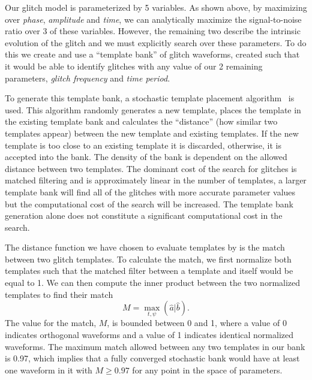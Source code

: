 Our \scl{} glitch model is parameterized by 5 variables. As shown above, by maximizing over \emph{phase}, \emph{amplitude} and \emph{time}, we can analytically maximize the signal-to-noise ratio over 3 of these variables. However, the remaining two describe the intrinsic evolution of the glitch and we must explicitly search over these parameters. To do this we create and use a ``template bank'' of \scl{} glitch waveforms, created such that it would be able to identify glitches with any value of our 2 remaining parameters, \emph{glitch frequency} and \emph{time period}.

To generate this template bank, a stochastic template placement algorithm~\cite{template_bank_placement} is used. This algorithm randomly generates a new template, places the template in the existing template bank and calculates the ``distance'' (how similar two templates appear) between the new template and existing templates. If the new template is too close to an existing template it is discarded, otherwise, it is accepted into the bank. The density of the bank is dependent on the allowed distance between two templates. The dominant cost of the search for \scl{} glitches is matched filtering and is approximately linear in the number of templates, a larger template bank will find all of the glitches with more accurate parameter values but the computational cost of the search will be increased. The template bank generation alone does not constitute a significant computational cost in the search.

The distance function we have chosen to evaluate templates by is the match between two glitch templates. To calculate the match, we first normalize both templates such that the matched filter between a template and itself would be equal to 1. We can then compute the inner product between the two normalized templates to find their match
%
\begin{equation}
    M = \max_{t, \psi} (\hat{a} | \hat{b}).
  \label{eqn:match}
\end{equation}
%
The value for the match, $M$,  is bounded between 0 and 1, where a value of 0 indicates orthogonal waveforms and a value of 1 indicates identical normalized waveforms. The maximum match allowed between any two templates in our bank is 0.97, which implies that a fully converged stochastic bank would have at least one waveform in it with $M \geq 0.97$ for any point in the space of parameters. 

